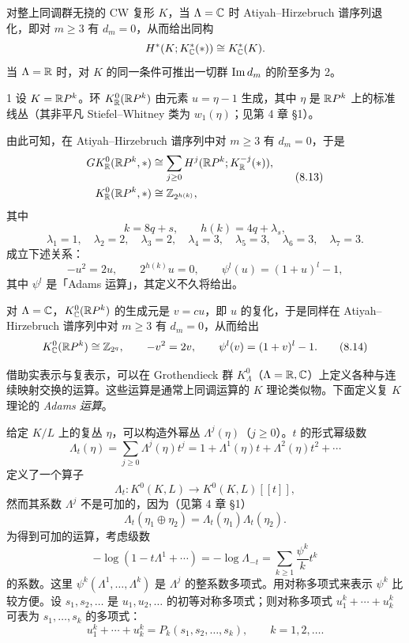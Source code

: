 对整上同调群无挠的 CW 复形 $K$，当 $\Lambda=\mathbb{C}$ 时 Atiyah--Hirzebruch 谱序列退化，即对 $m\ge3$ 有 $d_m=0$，从而给出同构
\[
H^*(K;K_{\mathbb{C}}^*(*))\cong K_{\mathbb{C}}^*(K).
\]
当 $\Lambda=\mathbb{R}$ 时，对 $K$ 的同一条件可推出一切群 $\operatorname{Im} d_m$ 的阶至多为 2。

\begin{example}{1}
设 $K=\mathbb{R}P^k$。环 $K_{\mathbb{R}}^0(\mathbb{R}P^k)$ 由元素 $u=\eta-1$ 生成，其中 $\eta$ 是 $\mathbb{R}P^k$ 上的标准线丛（其非平凡 Stiefel--Whitney 类为 $w_1(\eta)$；见第 4 章 §1）。

由此可知，在 Atiyah--Hirzebruch 谱序列中对 $m\ge3$ 有 $d_m=0$，于是
\begin{equation}
\begin{aligned}
GK_{\mathbb{R}}^0(\mathbb{R}P^k,*)&\cong\sum_{j\ge0}H^j(\mathbb{R}P^k;K_{\mathbb{R}}^{-j}(*)),\\
K_{\mathbb{R}}^0(\mathbb{R}P^k,*)&\cong\mathbb{Z}_{2^{h(k)}},
\end{aligned}
\tag{8.13}
\end{equation}
其中
\[
k=8q+s,\qquad h(k)=4q+\lambda_s,
\]
\[
\lambda_1=1,\quad\lambda_2=2,\quad\lambda_3=2,\quad\lambda_4=3,\quad\lambda_5=3,\quad\lambda_6=3,\quad\lambda_7=3.
\]
成立下述关系：
\[
-u^2=2u,\qquad 2^{h(k)}u=0,\qquad \psi^l(u)=(1+u)^l-1,
\]
其中 $\psi^l$ 是「Adams 运算」，其定义不久将给出。

对 $\Lambda=\mathbb{C}$，$K_{\mathbb{C}}^0(\mathbb{R}P^k)$ 的生成元是 $v=cu$，即 $u$ 的复化，于是同样在 Atiyah--Hirzebruch 谱序列中对 $m\ge3$ 有 $d_m=0$，从而给出
\begin{equation}
K_{\mathbb{C}}^0(\mathbb{R}P^k)\cong\mathbb{Z}_{2^q},\qquad -v^2=2v,\qquad \psi^l(v)=(1+v)^l-1. \tag{8.14}
\end{equation}
\end{example}

借助实表示与复表示，可以在 Grothendieck 群 $K_\Lambda^0$（$\Lambda=\mathbb{R},\mathbb{C}$）上定义各种与连续映射交换的运算。这些运算是通常上同调运算的 $K$ 理论类似物。下面定义复 $K$ 理论的 \emph{Adams 运算}。

给定 $K/L$ 上的复丛 $\eta$，可以构造外幂丛 $\Lambda^j(\eta)$（$j\ge0$）。$t$ 的形式幂级数
\[
\Lambda_t(\eta)=\sum_{j\ge0}\Lambda^j(\eta)t^j=1+\Lambda^1(\eta)t+\Lambda^2(\eta)t^2+\cdots
\]
定义了一个算子
\[
\Lambda_t:K^0(K,L)\longrightarrow K^0(K,L)[[t]],
\]
然而其系数 $\Lambda^j$ 不是可加的，因为（见第 4 章 §1）
\begin{equation}
\Lambda_t(\eta_1\oplus\eta_2)=\Lambda_t(\eta_1)\Lambda_t(\eta_2). \tag{8.15}
\end{equation}
为得到可加的运算，考虑级数
\[
-\log(1-t\Lambda^1+\cdots)=-\log\Lambda_{-t}=\sum_{k\ge1}\frac{\psi^k}{k}t^k
\]
的系数。这里 $\psi^k(\Lambda^1,\dots,\Lambda^k)$ 是 $\Lambda^j$ 的整系数多项式。用对称多项式来表示 $\psi^k$ 比较方便。设 $s_1,s_2,\dots$ 是 $u_1,u_2,\dots$ 的初等对称多项式；则对称多项式 $u_1^k+\cdots+u_k^k$ 可表为 $s_1,\dots,s_k$ 的多项式：
\[
u_1^k+\cdots+u_k^k=P_k(s_1,s_2,\dots,s_k),\qquad k=1,2,\dots .
\]


